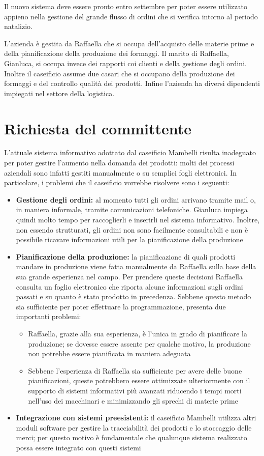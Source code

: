 Il nuovo sistema deve essere pronto entro settembre per poter essere utilizzato appieno nella gestione del grande flusso di ordini che si verifica intorno al periodo natalizio.

L'azienda è gestita da Raffaella che si occupa dell'acquisto delle materie prime e della pianificazione della produzione dei formaggi. Il marito di Raffaella, Gianluca, si occupa invece dei rapporti coi clienti e della gestione degli ordini. Inoltre il caseificio assume due casari che si occupano della produzione dei formaggi e del controllo qualità dei prodotti. Infine l'azienda ha diversi dipendenti impiegati nel settore della logistica.

\section{Richiesta del committente}\label{sec:richiesta-del-committente}
L'attuale sistema informativo adottato dal caseificio Mambelli risulta inadeguato per poter gestire l'aumento nella domanda dei prodotti: molti dei processi aziendali sono infatti gestiti manualmente o su semplici fogli elettronici. In particolare, i problemi che il caseificio vorrebbe risolvere sono i seguenti:
\begin{itemize}
  \item \textbf{Gestione degli ordini:} al momento tutti gli ordini arrivano tramite mail o, in maniera informale, tramite comunicazioni telefoniche. Gianluca impiega quindi molto tempo per raccoglierli e inserirli nel sistema informativo. Inoltre, non essendo strutturati, gli ordini non sono facilmente consultabili e non è possibile ricavare informazioni utili per la pianificazione della produzione
  \item \textbf{Pianificazione della produzione:} la pianificazione di quali prodotti mandare in produzione viene fatta manualmente da Raffaella sulla base della sua grande esperienza nel campo. Per prendere queste decisioni Raffaella consulta un foglio elettronico che riporta alcune informazioni sugli ordini passati e su quanto è stato prodotto in precedenza. Sebbene questo metodo sia sufficiente per poter effettuare la programmazione, presenta due importanti problemi:
        \begin{itemize}
          \item Raffaella, grazie alla sua esperienza, è l'unica in grado di pianificare la produzione; se dovesse essere assente per qualche motivo, la produzione non potrebbe essere pianificata in maniera adeguata
          \item Sebbene l'esperienza di Raffaella sia sufficiente per avere delle buone pianificazioni, queste potrebbero essere ottimizzate ulteriormente con il supporto di sistemi informativi più avanzati riducendo i tempi morti nell'uso dei macchinari e minimizzando gli sprechi di materie prime
        \end{itemize}
  \item \textbf{Integrazione con sistemi preesistenti:} il caseificio Mambelli utilizza altri moduli software per gestire la tracciabilità dei prodotti e lo stoccaggio delle merci; per questo motivo è fondamentale che qualunque sistema realizzato possa essere integrato con questi sistemi
\end{itemize}
